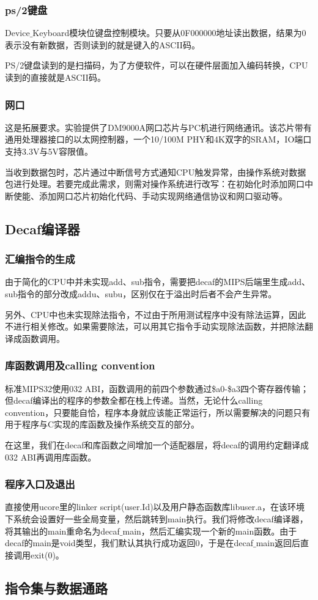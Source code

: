 \subsubsection{ps/2键盘}
Device$\_$Keyboard模块位键盘控制模块。只要从0F000000地址读出数据，结果为0表示没有新数据，否则读到的就是键入的ASCII码。

PS/2键盘读到的是扫描码，为了方便软件，可以在硬件层面加入编码转换，CPU读到的直接就是ASCII码。
\subsubsection{网口}
这是拓展要求。实验提供了DM9000A网口芯片与PC机进行网络通讯。该芯片带有通用处理器接口的以太网控制器，一个10/100M PHY和4K双字的SRAM，IO端口支持3.3V与5V容限值。

当收到数据包时，芯片通过中断信号方式通知CPU触发异常，由操作系统对数据包进行处理。若要完成此需求，则需对操作系统进行改写：在初始化时添加网口中断使能、添加网口芯片初始化代码、手动实现网络通信协议和网口驱动等。
\subsection{Decaf编译器}
\subsubsection{汇编指令的生成}
由于简化的CPU中并未实现add、sub指令，需要把decaf的MIPS后端里生成add、sub指令的部分改成addu、subu，区别仅在于溢出时后者不会产生异常。

另外、CPU中也未实现除法指令，不过由于所用测试程序中没有除法运算，因此不进行相关修改。如果需要除法，可以用其它指令手动实现除法函数，并把除法翻译成函数调用。
\subsubsection{库函数调用及calling convention}
标准MIPS32使用032 ABI，函数调用的前四个参数通过\$a0-\$a3四个寄存器传输；但decaf编译出的程序的参数全都在栈上传递。当然，无论什么calling convention，只要能自恰，程序本身就应该能正常运行，所以需要解决的问题只有用于程序与C实现的库函数及操作系统交互的部分。

在这里，我们在decaf和库函数之间增加一个适配器层，将decaf的调用约定翻译成032 ABI再调用库函数。
\subsubsection{程序入口及退出}
直接使用ucore里的linker script(user.Id)以及用户静态函数库libuser.a，在该环境下系统会设置好一些全局变量，然后跳转到main执行。我们将修改decaf编译器，将其输出的main重命名为decaf$\_$main，然后汇编实现一个新的main函数。由于decaf的main是void类型，我们默认其执行成功返回0，于是在decaf$\_$main返回后直接调用exit(0)。
\subsection{指令集与数据通路}

